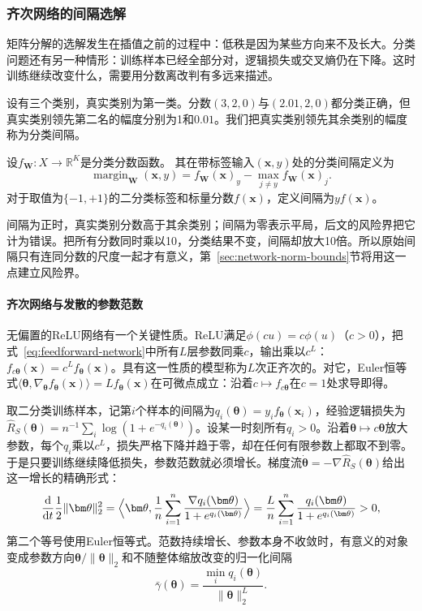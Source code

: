 \subsubsection{齐次网络的间隔选解}

矩阵分解的选解发生在插值之前的过程中：低秩是因为某些方向来不及长大。分类问题还有另一种情形：训练样本已经全部分对，逻辑损失或交叉熵仍在下降。这时训练继续改变什么，需要用分数离改判有多远来描述。

设有三个类别，真实类别为第一类。分数$(3,2,0)$与$(2.01,2,0)$都分类正确，但真实类别领先第二名的幅度分别为1和$0.01$。我们把真实类别领先其余类别的幅度称为分类间隔。

\begin{definition}[分类间隔]
\label{def:network-margin}
设$f_{\bm W}:X\to\mathbb R^K$是分类分数函数。
其在带标签输入$(\bm x,y)$处的分类间隔定义为
\begin{equation}
 \operatorname{margin}_{\bm W}(\bm x,y)
 =f_{\bm W}(\bm x)_y-\max_{j\neq y}f_{\bm W}(\bm x)_j.
 \label{eq:network-margin}
\end{equation}
对于取值为$\{-1,+1\}$的二分类标签和标量分数$f(\bm x)$，定义间隔为$yf(\bm x)$。
\end{definition}

间隔为正时，真实类别分数高于其余类别；间隔为零表示平局，后文的风险界把它计为错误。把所有分数同时乘以10，分类结果不变，间隔却放大10倍。所以原始间隔只有连同分数的尺度一起才有意义，第~\ref{sec:network-norm-bounds}节将用这一点建立风险界。

\paragraph{齐次网络与发散的参数范数}

无偏置的ReLU网络有一个关键性质。ReLU满足$\phi(cu)=c\phi(u)$（$c>0$），把式~\eqref{eq:feedforward-network}中所有$L$层参数同乘$c$，输出乘以$c^L$：$f_{c\bm\theta}(\bm x)=c^Lf_{\bm\theta}(\bm x)$。具有这一性质的模型称为$L$次正齐次的。对它，Euler恒等式$\langle\bm\theta,\nabla_{\bm\theta}f_{\bm\theta}(\bm x)\rangle=Lf_{\bm\theta}(\bm x)$在可微点成立：沿着$c\mapsto f_{c\bm\theta}$在$c=1$处求导即得。

取二分类训练样本，记第$i$个样本的间隔为$q_i(\bm\theta)=y_if_{\bm\theta}(\bm x_i)$，经验逻辑损失为$\hat R_S(\bm\theta)=n^{-1}\sum_i\log(1+e^{-q_i(\bm\theta)})$。设某一时刻所有$q_i>0$。沿着$\bm\theta\mapsto c\bm\theta$放大参数，每个$q_i$乘以$c^L$，损失严格下降并趋于零，却在任何有限参数上都取不到零。于是只要训练继续降低损失，参数范数就必须增长。梯度流$\dot{\bm\theta}=-\nabla\hat R_S(\bm\theta)$给出这一增长的精确形式：
\[
 \frac{\mathrm d}{\mathrm dt}\frac12\|\bm\theta\|_2^2
 =\Bigl\langle\bm\theta,\frac1n\sum_{i=1}^n\frac{\nabla q_i(\bm\theta)}{1+e^{q_i(\bm\theta)}}\Bigr\rangle
 =\frac Ln\sum_{i=1}^n\frac{q_i(\bm\theta)}{1+e^{q_i(\bm\theta)}}>0,
\]
第二个等号使用Euler恒等式。范数持续增长、参数本身不收敛时，有意义的对象变成参数方向$\bm\theta/\|\bm\theta\|_2$和不随整体缩放改变的归一化间隔
\[
 \bar\gamma(\bm\theta)=\frac{\min_iq_i(\bm\theta)}{\|\bm\theta\|_2^L}.
\]

